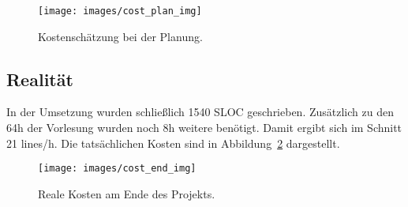 \begin{figure}[hbt]
	\centering
	\texttt{[image: images/cost\_plan\_img]}
	\caption[Kostenschätzung Planung]{Kostenschätzung bei der Planung.}
	\label{fig:cost_plan}
\end{figure}

\subsection{Realität}
In der Umsetzung wurden schließlich 1540 SLOC geschrieben. Zusätzlich zu den 64h der Vorlesung wurden noch 8h weitere benötigt. Damit ergibt sich im Schnitt 21 lines/h. Die tatsächlichen Kosten sind in Abbildung~\ref{fig:cost_end} dargestellt.
\begin{figure}[hbt]
	\centering
	\texttt{[image: images/cost\_end\_img]}
	\caption[Kosten Realität]{Reale Kosten am Ende des Projekts.}
	\label{fig:cost_end}
\end{figure}